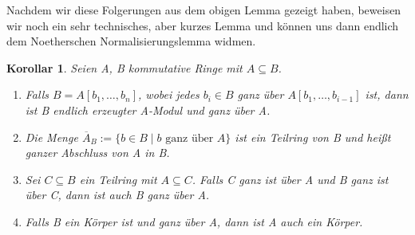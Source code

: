\documentclass{article}
\newtheorem{korollar}[satz]{Korollar}
\begin{document}
	Nachdem wir diese Folgerungen aus dem obigen Lemma gezeigt haben, beweisen wir noch ein sehr technisches, aber kurzes Lemma und können uns dann endlich dem 
	Noetherschen Normalisierungslemma widmen.

	\begin{korollar} \label{2.1.2}
	Seien A, B kommutative Ringe mit \(A \subseteq B\).
	\begin{enumerate}
	\item\label{2.1.2 a} Falls \(B = A[b_1, \ldots, b_n]\), wobei jedes \(b_i
	\in B\) ganz über \(A[b_1, \ldots, b_{i-1}]\) ist, dann ist B endlich
	erzeugter A-Modul und ganz über A.
	\item Die Menge \(\overline{A}_B := \{b \in B\;|\;b \text{ ganz über } A\}\) ist
	ein Teilring von B und heißt ganzer Abschluss von A in B.
	\item Sei \(C \subseteq B\) ein Teilring mit \(A \subseteq C\). Falls C
	ganz ist über A und B ganz ist über C, dann ist auch B ganz über A.
	\item Falls B ein Körper ist und ganz über A, dann ist A auch ein Körper.
	\end{enumerate}
	\end{korollar}
\end{document}
